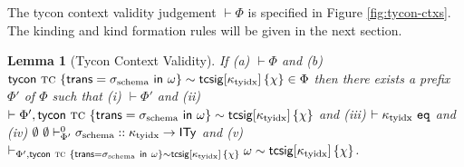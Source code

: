\documentclass[12pt]{article}
\newtheorem{lemma}{Lemma}
\begin{document}
The tycon context validity judgement $\vdash \Phi$ is specified in Figure \ref{fig:tycon-ctxs}. The kinding and kind formation rules will be given in the next section.



\begin{lemma}[Tycon Context Validity]
\label{lemma:tycon-context-validity}
If (a) $\vdash \Phi$ and (b) ${\sf tycon}~\textsc{tc} ~\{{\sf trans}=\sigma_\text{schema}~{\sf in}~\omega\} \sim {\sf tcsig}[\kappa_\text{tyidx}]\,\{\chi\} \in \Phi$ then there exists a prefix $\Phi'$ of $\Phi$ such that (i) $\vdash \Phi'$ and (ii) $\vdash \Phi', {\sf tycon}~\textsc{tc} ~\{{\sf trans}=\sigma_\text{schema}~{\sf in}~\omega\} \sim {\sf tcsig}[\kappa_\text{tyidx}]\,\{\chi\}$ and (iii) $\vdash \kappa_\text{tyidx}~\mathtt{eq}$ and (iv) $\emptyset~\emptyset \vdash_{\Phi'}^{0} \sigma_\text{schema} :: \kappa_\text{tyidx} \rightarrow {\sf ITy}$ and (v) $\vdash_{\Phi',  {\sf tycon}~\textsc{tc} ~\{{\sf trans}=\sigma_\text{schema}~{\sf in}~\omega\} \sim {\sf tcsig}[\kappa_\text{tyidx}]\,\{\chi\}} \omega \sim {\sf tcsig}[\kappa_\text{tyidx}]\,\{\chi\}$.
\end{lemma}
\end{document}
